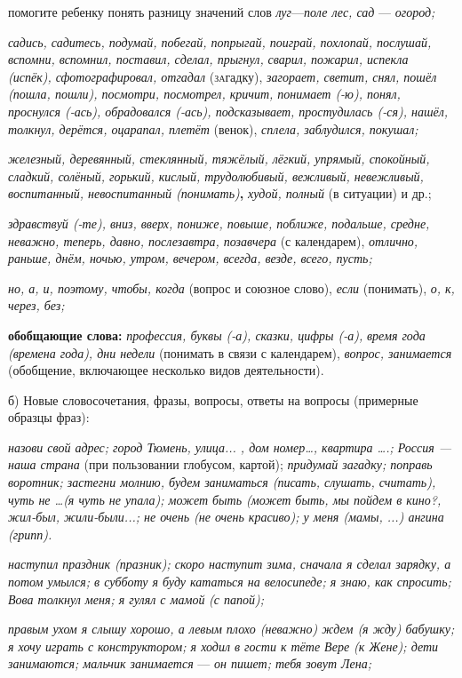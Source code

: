 \documentclass{book}
\renewcommand{\emph}[1]{\textit{#1}}
\begin{document}
помогите ребенку понять разницу значений слов \emph{луг}---\emph{поле
лес, сад} --- \emph{огород;}

\emph{садись, садитесь, подумай, побегай, попрыгай, поиграй, похлопай,
послушай, вспомни, вспомнил, поставил, сделал, прыгнул,} \emph{сварил,
пожарил, испекла (испёк), сфотографировал, отгадал} (\textsc{за}гадку),
\emph{загорает, светит, снял, пошёл (пошла, пошли), посмотри, посмотрел,
кричит, понимает (-ю), понял, проснулся (-ась), обрадовался (-ась),
подсказывает, простудилась (-ся), нашёл, толкнул, дерётся, оцарапал,
плетёт} (венок), \emph{сплела, заблудился, покушал;}

\emph{железный, деревянный, стеклянный, тяжёлый, лёгкий, упрямый,
спокойный, сладкий, солёный, горький, кислый, трудолюбивый, вежливый,
невежливый, воспитанный, невоспитанный (понимать)}\textbf{,}
\emph{худой, полный} (в ситуации) и др.;

\emph{здравствуй (-те), вниз, вверх, пониже, повыше, поближе, подальше,
средне, неважно, теперь, давно, послезавтра, позавчера} (с календарем),
\emph{отлично, раньше, днём, ночью, утром, вечером, всегда, везде,
всего, пусть;}

\emph{но, а, и, поэтому, чтобы, когда} (вопрос и союзное слово),
\emph{если} (понимать), \emph{о, к, через, без;}

\textbf{обобщающие слова:} \emph{профессия, буквы (-а), сказки, цифры
(-а),} \emph{время года (времена года), дни недели} (понимать в связи с
календарем), \emph{вопрос, занимается} (обобщение, включающее несколько
видов деятельности).

б) Новые словосочетания, фразы, вопросы, ответы на вопросы (примерные
образцы фраз):

\emph{назови свой адрес; город Тюмень, улица... , дом номер\ldots,
квартира \ldots.; Россия --- наша страна} (при пользовании глобусом,
картой); \emph{придумай загадку; поправь воротник; застегни молнию,
будем заниматься (писать, слушать, считать), чуть не \ldots(я чуть не
упала); может быть (может быть, мы пойдем в кино?, жил-был,
жили-были...; не очень (не очень красиво); у меня (мамы, ...) ангина
(грипп).}

\emph{наступил праздник (празник); скоро наступит зима, сначала я сделал
зарядку, а потом умылся; в субботу я буду кататься на велосипеде; я
знаю, как спросить; Вова толкнул меня; я гулял с мамой} \emph{(с
папой);}

\emph{правым ухом я слышу хорошо, а левым плохо (неважно) ждем (я жду)
бабушку; я хочу играть с конструктором; я ходил в гости к тёте Вере (к
Жене); дети занимаются; мальчик занимается} --- \emph{он пишет; тебя
зовут Лена;}
\end{document}
